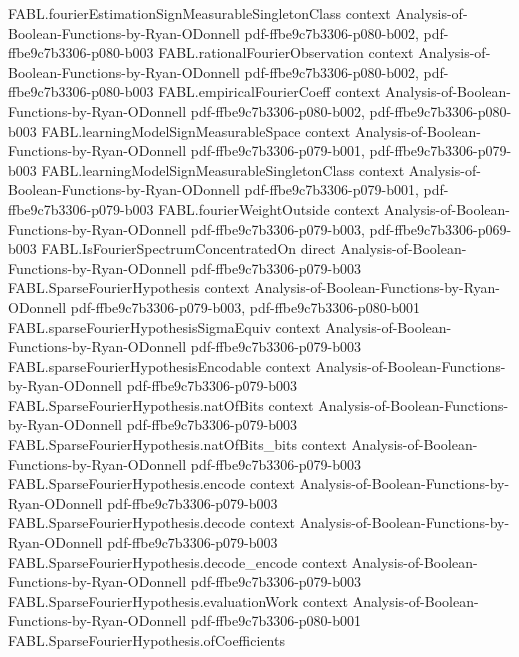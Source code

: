 \begin{theorem}
\proofstep
  {FABL.fourierEstimationSignMeasurableSingletonClass}
  {context}
  {Analysis-of-Boolean-Functions-by-Ryan-ODonnell}
  {pdf-ffbe9c7b3306-p080-b002,
    pdf-ffbe9c7b3306-p080-b003}
\proofstep
  {FABL.rationalFourierObservation}
  {context}
  {Analysis-of-Boolean-Functions-by-Ryan-ODonnell}
  {pdf-ffbe9c7b3306-p080-b002,
    pdf-ffbe9c7b3306-p080-b003}
\proofstep
  {FABL.empiricalFourierCoeff}
  {context}
  {Analysis-of-Boolean-Functions-by-Ryan-ODonnell}
  {pdf-ffbe9c7b3306-p080-b002,
    pdf-ffbe9c7b3306-p080-b003}
\proofstep
  {FABL.learningModelSignMeasurableSpace}
  {context}
  {Analysis-of-Boolean-Functions-by-Ryan-ODonnell}
  {pdf-ffbe9c7b3306-p079-b001,
    pdf-ffbe9c7b3306-p079-b003}
\proofstep
  {FABL.learningModelSignMeasurableSingletonClass}
  {context}
  {Analysis-of-Boolean-Functions-by-Ryan-ODonnell}
  {pdf-ffbe9c7b3306-p079-b001,
    pdf-ffbe9c7b3306-p079-b003}
\proofstep
  {FABL.fourierWeightOutside}
  {context}
  {Analysis-of-Boolean-Functions-by-Ryan-ODonnell}
  {pdf-ffbe9c7b3306-p079-b003,
    pdf-ffbe9c7b3306-p069-b003}
\proofstep
  {FABL.IsFourierSpectrumConcentratedOn}
  {direct}
  {Analysis-of-Boolean-Functions-by-Ryan-ODonnell}
  {pdf-ffbe9c7b3306-p079-b003}
\proofstep
  {FABL.SparseFourierHypothesis}
  {context}
  {Analysis-of-Boolean-Functions-by-Ryan-ODonnell}
  {pdf-ffbe9c7b3306-p079-b003,
    pdf-ffbe9c7b3306-p080-b001}
\proofstep
  {FABL.sparseFourierHypothesisSigmaEquiv}
  {context}
  {Analysis-of-Boolean-Functions-by-Ryan-ODonnell}
  {pdf-ffbe9c7b3306-p079-b003}
\proofstep
  {FABL.sparseFourierHypothesisEncodable}
  {context}
  {Analysis-of-Boolean-Functions-by-Ryan-ODonnell}
  {pdf-ffbe9c7b3306-p079-b003}
\proofstep
  {FABL.SparseFourierHypothesis.natOfBits}
  {context}
  {Analysis-of-Boolean-Functions-by-Ryan-ODonnell}
  {pdf-ffbe9c7b3306-p079-b003}
\proofstep
  {FABL.SparseFourierHypothesis.natOfBits_bits}
  {context}
  {Analysis-of-Boolean-Functions-by-Ryan-ODonnell}
  {pdf-ffbe9c7b3306-p079-b003}
\proofstep
  {FABL.SparseFourierHypothesis.encode}
  {context}
  {Analysis-of-Boolean-Functions-by-Ryan-ODonnell}
  {pdf-ffbe9c7b3306-p079-b003}
\proofstep
  {FABL.SparseFourierHypothesis.decode}
  {context}
  {Analysis-of-Boolean-Functions-by-Ryan-ODonnell}
  {pdf-ffbe9c7b3306-p079-b003}
\proofstep
  {FABL.SparseFourierHypothesis.decode_encode}
  {context}
  {Analysis-of-Boolean-Functions-by-Ryan-ODonnell}
  {pdf-ffbe9c7b3306-p079-b003}
\proofstep
  {FABL.SparseFourierHypothesis.evaluationWork}
  {context}
  {Analysis-of-Boolean-Functions-by-Ryan-ODonnell}
  {pdf-ffbe9c7b3306-p080-b001}
\proofstep
  {FABL.SparseFourierHypothesis.ofCoefficients}

\end{theorem}
